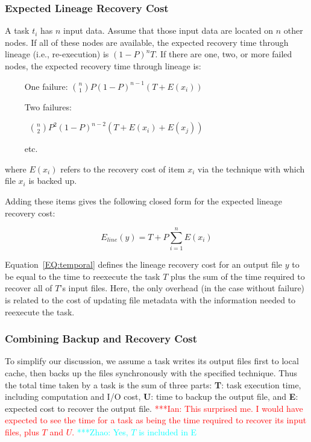 \documentclass{sig-alternate}
\newcommand{\iannote}[1]{ {\textcolor{red}    { ***Ian:      #1 }}}
\newcommand{\zhaonote}[1]{{\textcolor{cyan}    { ***Zhao:      #1 }}}
\newcommand{\iannote}[1]{}
\newcommand{\zhaonote}[1]{}
\begin{document}
\subsubsection{Expected Lineage Recovery Cost}
A task $t_i$ has $n$ input data. Assume that those input data are located on $n$ other nodes.
If all of these nodes are available, the expected recovery time through lineage (i.e., re-execution) is
$(1-P)^nT$. If there are one, two, or more failed nodes, the expected recovery time through lineage is:

\noindent ~~~~ One failure:
%
${n \choose 1}P(1-P)^{n-1}(T+E(x_i))$

\noindent ~~~~ Two failures:

~~~~~ ${n \choose 2}P^2(1-P)^{n-2}(T+E(x_i)+E(x_j))$

\noindent ~~~~ etc.

\noindent where ${E(x_i)}$ refers to the recovery cost of item ${x_i}$ via the technique with which file ${x_i}$ is backed up. 


Adding these items gives the following closed form for the expected lineage recovery cost:

\begin{equation}
E_{line}(y) = T+P\sum_{i=1}^{n}E(x_i)
\label{EQ:temporal}
\end{equation}

Equation~\ref{EQ:temporal} defines the lineage recovery cost for an output file $y$ to be
equal to the time to reexecute the task $T$ plus the sum of the time required to recover all of $T$'s
input files. Here, the only overhead (in the case without failure) is related to 
the cost of updating file metadata with the information needed to reexecute the task.

\subsubsection{Combining Backup and Recovery Cost}
To simplify our discussion, we assume a task writes its output files first to local cache, then backs up the files synchronously with the specified technique. Thus the total time taken by a task is the sum of three parts:
{\bf T}: task execution time, including computation and I/O cost,
{\bf U}: time to backup the output file,
and {\bf E}: expected cost to recover the output file.
\iannote{This surprised me. I would have expected to see the time for a task
as being the time required to recover its input files, plus $T$ and $U$.}
\zhaonote{Yes, $T$ is included in E}
\end{document}
